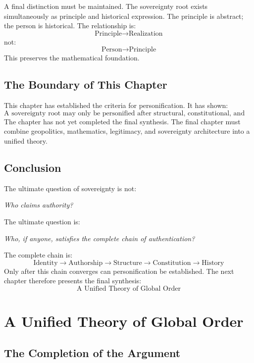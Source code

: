 \documentclass[11pt,openany]{book}
\theoremstyle{plain}
\theoremstyle{definition}
\begin{document}
A final distinction must be maintained. The sovereignty root exists simultaneously as principle and historical expression. The principle is abstract; the person is historical. The relationship is:
\[
\text{Principle} \longrightarrow \text{Realization}
\]
not:
\[
\text{Person} \longrightarrow \text{Principle}
\]
This preserves the mathematical foundation.

\section{The Boundary of This Chapter}

This chapter has established the criteria for personification. It has shown:
\[
\boxed{
\text{A sovereignty root may only be personified after structural, constitutional, and historical authentication.}
}
\]
The chapter has not yet completed the final synthesis. The final chapter must combine geopolitics, mathematics, legitimacy, and sovereignty architecture into a unified theory.

\section{Conclusion}

The ultimate question of sovereignty is not:
\begin{center}
\textit{Who claims authority?}
\end{center}
The ultimate question is:
\begin{center}
\textit{Who, if anyone, satisfies the complete chain of authentication?}
\end{center}
The complete chain is:
\[
\boxed{
\text{Identity} \longrightarrow \text{Authorship} \longrightarrow \text{Structure} \longrightarrow \text{Constitution} \longrightarrow \text{History}
}
\]
Only after this chain converges can personification be established. The next chapter therefore presents the final synthesis:
\[
\boxed{
\text{A Unified Theory of Global Order}
}
\]


\chapter{A Unified Theory of Global Order}

\section{The Completion of the Argument}
\end{document}
